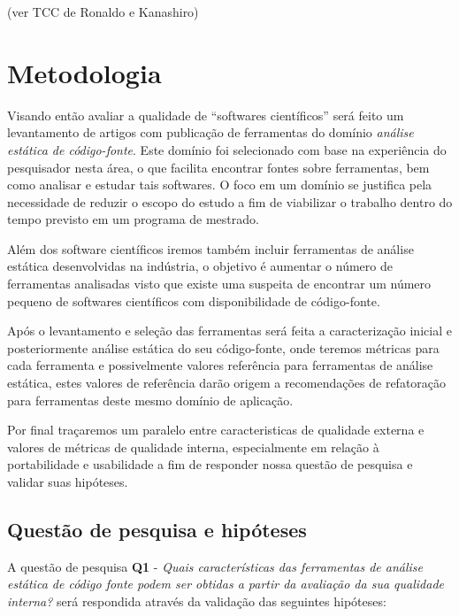 \documentclass[qual, classic, a4paper]{ufbathesis}
\begin{document}
(ver TCC de Ronaldo e Kanashiro)

\chapter{Metodologia}

Visando então avaliar a qualidade de ``softwares científicos'' será feito um
levantamento de artigos com publicação de ferramentas do domínio {\it análise
estática de código-fonte}. Este domínio foi selecionado com base na
experiência do pesquisador nesta área, o que facilita encontrar fontes sobre
ferramentas, bem como analisar e estudar tais softwares. O foco em um domínio
se justifica pela necessidade de reduzir o escopo do estudo a fim de
viabilizar o trabalho dentro do tempo previsto em um programa de mestrado.

Além dos software científicos iremos também incluir ferramentas de análise
estática desenvolvidas na indústria, o objetivo é aumentar o número de
ferramentas analisadas visto que existe uma suspeita de encontrar um número
pequeno de softwares científicos com disponibilidade de código-fonte.

Após o levantamento e seleção das ferramentas será feita a caracterização
inicial e posteriormente análise estática do seu código-fonte, onde teremos
métricas para cada ferramenta e possivelmente valores referência para
ferramentas de análise estática, estes valores de referência darão origem a
recomendações de refatoração para ferramentas deste mesmo domínio de
aplicação.

Por final traçaremos um paralelo entre caracteristicas de qualidade externa e
valores de métricas de qualidade interna, especialmente em relação à
portabilidade e usabilidade a fim de responder nossa questão de pesquisa
e validar suas hipóteses.


\section{Questão de pesquisa e hipóteses}

A questão de pesquisa {\bf Q1} - {\it Quais características das ferramentas de
análise estática de código fonte podem ser obtidas a partir da avaliação da
sua qualidade interna?} será respondida através da validação das seguintes
hipóteses:
\end{document}
